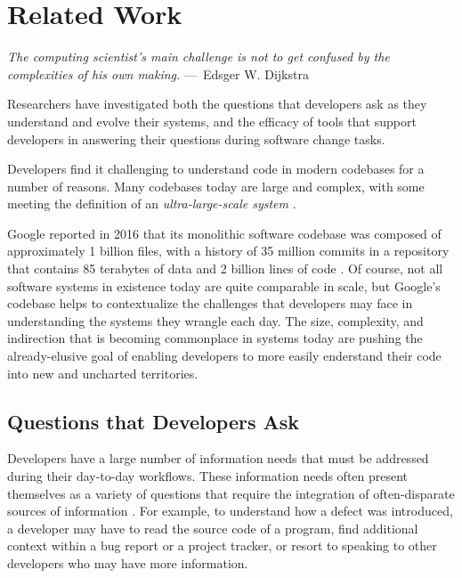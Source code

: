 
\chapter{Related Work}
\label{ch:RelatedWork}

\begin{epigraph}
    \emph{
       The computing scientist’s main challenge is not to get confused by the 
       complexities of his own making.
     } ---~Edsger W. Dijkstra
\end{epigraph}

\noindent Researchers have investigated both the questions that developers ask 
as they understand and evolve their systems, and the efficacy of tools 
that support developers in answering their questions during software change 
tasks.

\par Developers find it challenging to understand code in modern codebases for
a number of reasons.
Many codebases today are large and complex, with some meeting the definition of 
an \emph{ultra-large-scale system} \cite{feiler-2006-ulss}.

\par Google reported in 2016 that its monolithic software codebase was composed
of approximately 1 billion files, with a history of 35 million commits in a
repository that contains 85 terabytes of data and 2 billion lines of code
\cite{potvin-2016-google}.
Of course, not all software systems in existence today are quite comparable in 
scale, but Google's codebase helps to contextualize the challenges that 
developers may face in understanding the systems they wrangle each day.
The size, complexity, and indirection that is becoming commonplace in systems
today \cite{latoza-2010-reach} are pushing the already-elusive goal of
enabling developers to more easily enderstand their code into new and 
uncharted territories.

\section{Questions that Developers Ask}
\label{sec:QuestionsThatDeveloperAsk}

\noindent Developers have a large number of information needs that must be
addressed during their day-to-day workflows.
These information needs often present themselves as a variety of questions
that require the integration of often-disparate sources of information
\cite{fritz-2010-info-frag}.
For example, to understand how a defect was introduced, a developer may have to
read the source code of a program, find additional context within a bug report
or a project tracker, or resort to speaking to other developers who may have 
more information. 

